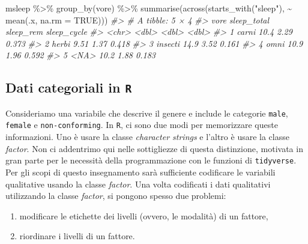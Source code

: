 \documentclass[
  10pt,
  italian,
  a4paper,
  extrafontsizes,onecolumn,openright
  ]{memoir}
\newenvironment{Shaded}{\begin{snugshade}}{\end{snugshade}}
\newcommand{\AttributeTok}[1]{\textcolor[rgb]{0.77,0.63,0.00}{#1}}
\newcommand{\CommentTok}[1]{\textcolor[rgb]{0.56,0.35,0.01}{\textit{#1}}}
\newcommand{\ConstantTok}[1]{\textcolor[rgb]{0.00,0.00,0.00}{#1}}
\newcommand{\FunctionTok}[1]{\textcolor[rgb]{0.00,0.00,0.00}{#1}}
\newcommand{\NormalTok}[1]{#1}
\newcommand{\SpecialCharTok}[1]{\textcolor[rgb]{0.00,0.00,0.00}{#1}}
\newcommand{\StringTok}[1]{\textcolor[rgb]{0.31,0.60,0.02}{#1}}
\providecommand{\tightlist}{%
  \setlength{\itemsep}{0pt}\setlength{\parskip}{0pt}}
\begin{document}
\begin{Shaded}
\begin{Highlighting}[]
\NormalTok{msleep }\SpecialCharTok{\%\textgreater{}\%}
  \FunctionTok{group\_by}\NormalTok{(vore) }\SpecialCharTok{\%\textgreater{}\%}
  \FunctionTok{summarise}\NormalTok{(}\FunctionTok{across}\NormalTok{(}\FunctionTok{starts\_with}\NormalTok{(}\StringTok{"sleep"}\NormalTok{), }\SpecialCharTok{\textasciitilde{}} \FunctionTok{mean}\NormalTok{(.x, }\AttributeTok{na.rm =} \ConstantTok{TRUE}\NormalTok{)))}
\CommentTok{\#\textgreater{} \# A tibble: 5 × 4}
\CommentTok{\#\textgreater{}   vore    sleep\_total sleep\_rem sleep\_cycle}
\CommentTok{\#\textgreater{}   \textless{}chr\textgreater{}         \textless{}dbl\textgreater{}     \textless{}dbl\textgreater{}       \textless{}dbl\textgreater{}}
\CommentTok{\#\textgreater{} 1 carni         10.4       2.29       0.373}
\CommentTok{\#\textgreater{} 2 herbi          9.51      1.37       0.418}
\CommentTok{\#\textgreater{} 3 insecti       14.9       3.52       0.161}
\CommentTok{\#\textgreater{} 4 omni          10.9       1.96       0.592}
\CommentTok{\#\textgreater{} 5 \textless{}NA\textgreater{}          10.2       1.88       0.183}
\end{Highlighting}
\end{Shaded}

\hypertarget{dati-categoriali-in-r}{%
\subsection{\texorpdfstring{Dati categoriali in \texttt{R}}{Dati categoriali in R}}\label{dati-categoriali-in-r}}

Consideriamo una variabile che descrive il genere e include le categorie \texttt{male}, \texttt{female} e \texttt{non-conforming}. In \texttt{R}, ci sono due modi per memorizzare queste informazioni. Uno è usare la classe \emph{character strings} e l'altro è usare la classe \emph{factor}. Non ci addentrimo qui nelle sottigliezze di questa distinzione, motivata in gran parte per le necessità della programmazione con le funzioni di \texttt{tidyverse}. Per gli scopi di questo insegnamento sarà sufficiente codificare le variabili qualitative usando la classe \emph{factor}. Una volta codificati i dati qualitativi utilizzando la classe \emph{factor}, si pongono spesso due problemi:

\begin{enumerate}
\def\labelenumi{\arabic{enumi}.}
\tightlist
\item
  modificare le etichette dei livelli (ovvero, le modalità) di un fattore,
\item
  riordinare i livelli di un fattore.
\end{enumerate}
\end{document}
